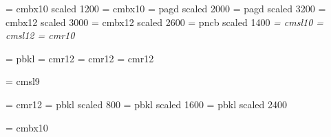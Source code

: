 \font\boa   = cmbx10 scaled 1200   %
\font\bob   = cmbx10               %
\font\hdcap = pagd scaled 2000     %
\font\indx  = pagd scaled 3200     %
\font\capa  = cmbx12 scaled 3000   %
\font\capb  = cmbx12 scaled 2600   %
\font\sec   = pncb scaled 1400     %
\font\sl    = cmsl10               %
\font\bsl   = cmsl12               %
\font\trm   = cmr10                %

\font\gare  = pbkl                 %
\font\garb  = cmr12                %
\font\garc  = cmr12                %
\font\gard  = cmr12                %

\font\cit   = cmsl9


\font\acb   = cmr12                  %
\font\aaa   = pbkl scaled 800
\font\bbb   = pbkl scaled 1600
\font\bbbb  = pbkl scaled 2400


\font\gara  = cmbx10                   %
